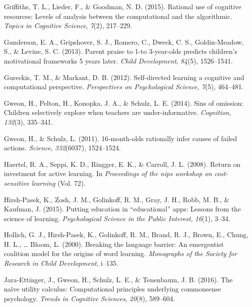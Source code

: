 \documentclass[oneside]{report}
\begin{document}
\leavevmode\hypertarget{ref-griffiths2015rational}{}%
Griffiths, T. L., Lieder, F., \& Goodman, N. D. (2015). Rational use of
cognitive resources: Levels of analysis between the computational and
the algorithmic. \emph{Topics in Cognitive Science}, \emph{7}(2),
217--229.

\leavevmode\hypertarget{ref-gunderson2013parent}{}%
Gunderson, E. A., Gripshover, S. J., Romero, C., Dweck, C. S.,
Goldin-Meadow, S., \& Levine, S. C. (2013). Parent praise to 1-to
3-year-olds predicts children's motivational frameworks 5 years later.
\emph{Child Development}, \emph{84}(5), 1526--1541.

\leavevmode\hypertarget{ref-gureckis2012self}{}%
Gureckis, T. M., \& Markant, D. B. (2012). Self-directed learning a
cognitive and computational perspective. \emph{Perspectives on
Psychological Science}, \emph{7}(5), 464--481.

\leavevmode\hypertarget{ref-gweon2014sins}{}%
Gweon, H., Pelton, H., Konopka, J. A., \& Schulz, L. E. (2014). Sins of
omission: Children selectively explore when teachers are
under-informative. \emph{Cognition}, \emph{132}(3), 335--341.

\leavevmode\hypertarget{ref-gweon201116}{}%
Gweon, H., \& Schulz, L. (2011). 16-month-olds rationally infer causes
of failed actions. \emph{Science}, \emph{332}(6037), 1524--1524.

\leavevmode\hypertarget{ref-haertel2008return}{}%
Haertel, R. A., Seppi, K. D., Ringger, E. K., \& Carroll, J. L. (2008).
Return on investment for active learning. In \emph{Proceedings of the
nips workshop on cost-sensitive learning} (Vol. 72).

\leavevmode\hypertarget{ref-hirsh2015putting}{}%
Hirsh-Pasek, K., Zosh, J. M., Golinkoff, R. M., Gray, J. H., Robb, M.
B., \& Kaufman, J. (2015). Putting education in ``educational'' apps:
Lessons from the science of learning. \emph{Psychological Science in the
Public Interest}, \emph{16}(1), 3--34.

\leavevmode\hypertarget{ref-hollich2000breaking}{}%
Hollich, G. J., Hirsh-Pasek, K., Golinkoff, R. M., Brand, R. J., Brown,
E., Chung, H. L., \ldots{} Bloom, L. (2000). Breaking the language
barrier: An emergentist coalition model for the origins of word
learning. \emph{Monographs of the Society for Research in Child
Development}, i--135.

\leavevmode\hypertarget{ref-jara2016naive}{}%
Jara-Ettinger, J., Gweon, H., Schulz, L. E., \& Tenenbaum, J. B. (2016).
The naïve utility calculus: Computational principles underlying
commonsense psychology. \emph{Trends in Cognitive Sciences},
\emph{20}(8), 589--604.
\end{document}
